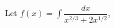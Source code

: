 \documentclass[preview]{standalone}
\begin{document}
\begin{center}
Let $f(x) = \int \dfrac{dx}{x^{2/3} + 2x^{1/2}}$,
\end{center}
\end{document}
